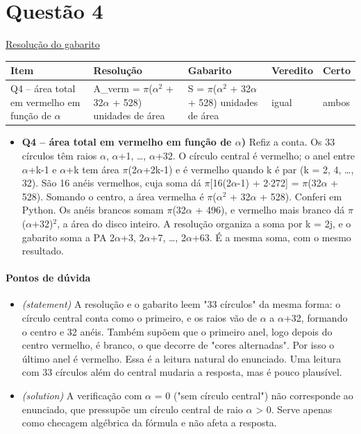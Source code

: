 \documentclass{article}%
\begin{document}
\section*{Questão 4}%
\href{https://poliedroresolve.sistemapoliedro.com.br/vestibulares/ita/2026/ita-2-fase-dia-1-28-10-2025-2-fase-dia-1/dissertativa-4-matematica-2-fase-dia-1-ita-2026}{Resolução do gabarito}\par\smallskip%
\begin{longtable}{@{}p{} p{} p{} p{} p{}@{}}\toprule Item & Resolução & Gabarito & Veredito & Certo \\ \midrule
Q4 -- área total em vermelho em função de $\alpha$ & A\_verm = $\pi$($\alpha$$^2$ + 32$\alpha$ + 528) unidades de área & S = $\pi$($\alpha$$^2$ + 32$\alpha$ + 528) unidades de área & igual & ambos \\
\bottomrule\end{longtable}%
\begin{itemize}%
\item%
\textbf{Q4 -- área total em vermelho em função de $\alpha$)} Refiz a conta. Os 33 círculos têm raios $\alpha$, $\alpha$+1, \ldots{}, $\alpha$+32. O círculo central é vermelho; o anel entre $\alpha$+k-1 e $\alpha$+k tem área $\pi$(2$\alpha$+2k-1) e é vermelho quando k é par (k = 2, 4, \ldots{}, 32). São 16 anéis vermelhos, cuja soma dá $\pi${[}16(2$\alpha$-1) + 2$\cdot$272{]} = $\pi$(32$\alpha$ + 528). Somando o centro, a área vermelha é $\pi$($\alpha$$^2$ + 32$\alpha$ + 528). Conferi em Python. Os anéis brancos somam $\pi$(32$\alpha$ + 496), e vermelho mais branco dá $\pi$($\alpha$+32)$^2$, a área do disco inteiro. A resolução organiza a soma por k = 2j, e o gabarito soma a PA 2$\alpha$+3, 2$\alpha$+7, \ldots{}, 2$\alpha$+63. É a mesma soma, com o mesmo resultado.%
\end{itemize}%
\paragraph{Pontos de dúvida}%
\begin{itemize}%
\item%
\textit{(statement)} A resolução e o gabarito leem "33 círculos" da mesma forma: o círculo central conta como o primeiro, e os raios vão de $\alpha$ a $\alpha$+32, formando o centro e 32 anéis. Também supõem que o primeiro anel, logo depois do centro vermelho, é branco, o que decorre de "cores alternadas". Por isso o último anel é vermelho. Essa é a leitura natural do enunciado. Uma leitura com 33 círculos além do central mudaria a resposta, mas é pouco plausível.%
\item%
\textit{(solution)} A verificação com $\alpha$ = 0 ("sem círculo central") não corresponde ao enunciado, que pressupõe um círculo central de raio $\alpha$ > 0. Serve apenas como checagem algébrica da fórmula e não afeta a resposta.%
\end{itemize}%
\end{document}
